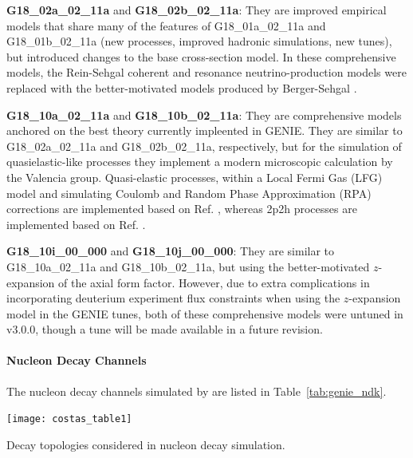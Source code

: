 {\bf G18\_02a\_02\_11a} and {\bf G18\_02b\_02\_11a}: They are improved empirical models that share many of the features of G18\_01a\_02\_11a and G18\_01b\_02\_11a (new processes, improved hadronic simulations, new tunes), but introduced changes to the base cross-section model. In these comprehensive models, the Rein-Sehgal coherent and resonance neutrino-production models \cite{Rein:2006di, Rein:1980wg} were replaced with the better-motivated models produced by Berger-Sehgal \cite{Berger:2008xs, Berger:2007rq}.

{\bf G18\_10a\_02\_11a} and {\bf G18\_10b\_02\_11a}: They are comprehensive models anchored on the best theory currently impleented in GENIE. They are similar to G18\_02a\_02\_11a and G18\_02b\_02\_11a, respectively, but for the simulation of quasielastic-like processes they implement a modern microscopic calculation by the Valencia group. Quasi-elastic processes, within a Local Fermi Gas (LFG) model and simulating Coulomb and Random Phase Approximation (RPA) corrections are implemented based on Ref. \cite{Nieves:2004wx}, whereas 2p2h processes are implemented based on Ref. \cite{Nieves:2011pp}.

{\bf G18\_10i\_00\_000} and {\bf G18\_10j\_00\_000}: They are similar to G18\_10a\_02\_11a and G18\_10b\_02\_11a, but using the better-motivated $z$-expansion \cite{Hill:2010yb} of the axial form factor. However, due to extra complications in incorporating deuterium experiment flux constraints when using the $z$-expansion model in the GENIE tunes, both of these comprehensive models were untuned in v3.0.0, though a tune will be made available in a future revision. 
\paragraph{Nucleon Decay Channels}

The nucleon decay channels simulated by  are listed in Table~\ref{tab:genie_ndk}.


\begin{table} %
  \texttt{[image: costas\_table1]}
  
  \caption[GENIE nucleon decay topologies]{Decay topologies considered in  nucleon decay simulation.}
  \label{tab:genie_ndk}
\end{table}

%  



